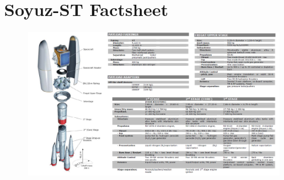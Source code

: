\documentclass[11pt]{report}
\begin{document}
%
%

%

%
%




%
%

\appendix
\chapter{Soyuz-ST Factsheet}
\label{appa}
\newpage
\begin{figure}[ht]
\centering
\includegraphics[scale = 0.4, angle=270]{chapters/img/soyuzfact.png}
\label{fig:soyuzfact}

\end{figure}

\newpage


\newpage


\newpage

\end{document}
